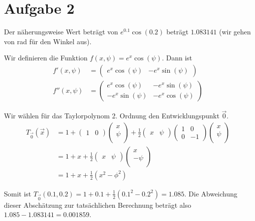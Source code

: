 \documentclass[10pt,a4paper,parskip=half]{scrartcl}
\newcommand{\vectwo}[2]{\begin{pmatrix}#1\\#2\\\end {pmatrix}}
\begin{document}
\section*{Aufgabe 2}
Der näherungsweise Wert beträgt von  $e^{0.1}\cos(0.2)$ beträgt $1.083141$ (wir gehen von rad für den Winkel aus).

Wir definieren die Funktion $f(x,\psi) = e^x\cos(\psi)$. Dann ist
\begin{align*}
f'(x,\psi) &= 
\begin{pmatrix}
e^x\cos(\psi) & -e^x\sin(\psi)
\end{pmatrix} \\
f''(x,\psi) &= 
\begin{pmatrix}
e^x\cos(\psi) & -e^x\sin(\psi) \\
-e^x\sin(\psi) & -e^x\cos(\psi)
\end{pmatrix}
\end{align*}


Wir wählen für das Taylorpolynom 2. Ordnung den Entwicklungspunkt $\vec 0$.
\begin{align*} 
T_{\vec 0}(\vec x) &= 1 + \begin{pmatrix}1 & 0\end{pmatrix}\vectwo{x}{\psi} +\frac{1}{2} \begin{pmatrix}x & \psi\end{pmatrix}
\begin{pmatrix}
1 & 0 \\
0 & -1
\end{pmatrix}
\vectwo{x}{\psi} \\
&= 1 + x + \frac{1}{2}\begin{pmatrix}x & \psi\end{pmatrix}\vectwo{x}{-\psi} \\
&= 1 + x + \frac{1}{2}(x^2 - \phi^2)
\end{align*}

Somit ist $T_{\vec 0}(0.1, 0.2) = 1 + 0.1 + \frac{1}{2}(0.1^2 - 0.2^2) = 1.085$. Die Abweichung dieser Abschätzung zur tatsächlichen Berechnung beträgt also $1.085 - 1.083141 = 0.001859$.
\end{document}
